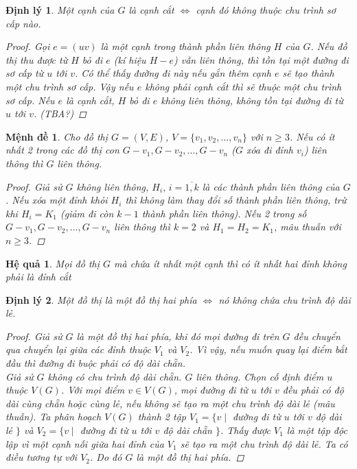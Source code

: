 \documentclass[14pt]{extarticle}
\newtheorem{theorem}{Định lý}[section]
\newtheorem{proposition}{Mệnh đề}[section]
\newtheorem{corolarry}{Hệ quả}[section]
\begin{document}
\begin{theorem}
Một cạnh của $G$ là cạnh cắt $\iff$ cạnh đó không thuộc chu trình sơ cấp nào.	
\begin{proof}
	Gọi $e=(uv)$ là một cạnh trong thành phần liên thông $H$ của $G$. Nếu đồ thị thu được từ $H$ bỏ đi $e$ (kí hiệu $H-e$) vẫn liên thông, thì tồn tại một đường đi sơ cấp từ $u$ tới $v$. Có thể thấy đường đi này nếu gắn thêm cạnh $e$ sẽ tạo thành một chu trình sơ cấp. Vậy nếu $e$ không phải cạnh cắt thì sẽ thuộc một chu trình sơ cấp. Nếu $e$ là cạnh cắt, $H$ bỏ đi $e$ không liên thông, không tồn tại đường đi từ $u$ tới $v$. (TBA?)
\end{proof}
\end{theorem}

\begin{proposition}
	Cho đồ thị $G = (V,E)$, $V=\{v_1, v_2,\ldots,v_n\}$ với $n \ge 3$. Nếu có ít nhất 2 trong các đồ thị con $G-v_1,G-v_2,\ldots,G-v_n$ ($G$ xóa đi đỉnh $v_i$) liên thông thì $G$ liên thông.
	\begin{proof}
		Giả sử $G$ không liên thông, $H_i,\, i = \overline{1,k}$ là các thành phần liên thông của $G$. Nếu xóa một đỉnh khỏi $H_i$ thì không làm thay đổi số thành phần liên thông, trừ khi $H_i = K_1$ (giảm đi còn $k-1$ thành phần liên thông). Nếu 2 trong số $G-v_1,G-v_2,\ldots,G-v_n$ liên thông thì $k = 2$ và $H_1 = H_2 = K_1$, mâu thuẫn với $n \ge 3$.
	\end{proof}
\end{proposition}

\begin{corolarry} Mọi đồ thị $G$ mà chứa ít nhất một cạnh thì có ít nhất hai đỉnh không phải là đỉnh cắt\end{corolarry}
\begin{theorem}
Một đồ thị là một đồ thị hai phía $\iff$ nó không chứa chu trình độ dài lẻ.	
\begin{proof}
	Giả sử $G$ là một đồ thị hai phía, khi đó mọi đường đi trên $G$ đều chuyển qua chuyển lại giữa các đỉnh thuộc $V_1$ và $V_2$. Vì vậy, nếu muốn quay lại điểm bắt đầu thì đường đi buộc phải có độ dài chẵn.\\
	Giả sử $G$ không có chu trình độ dài chẵn. $G$ liên thông. Chọn cố định điểm $u$ thuộc $V(G)$. Với mọi điểm $v \in V(G)$, mọi đường đi từ $u$ tới $v$ đều phải có độ dài cùng chẵn hoặc cùng lẻ, nếu không sẽ tạo ra một chu trình độ dài lẻ (mâu thuẫn). Ta phân hoạch $V(G)$ thành 2 tập $V_1 = \{v\mid$ đường đi từ $u$ tới $v$ độ dài lẻ $\}$ và $V_2 = \{v\mid$ đường đi từ $u$ tới $v$ độ dài chẵn $\}$. Thấy được $V_1$ là một tập độc lập vì một cạnh nối giữa hai đỉnh của $V_1$ sẽ tạo ra một chu trình độ dài lẻ. Ta có điều tương tự với $V_2$. Do đó $G$ là một đồ thị hai phía.
\end{proof}
\end{theorem}
\end{document}
